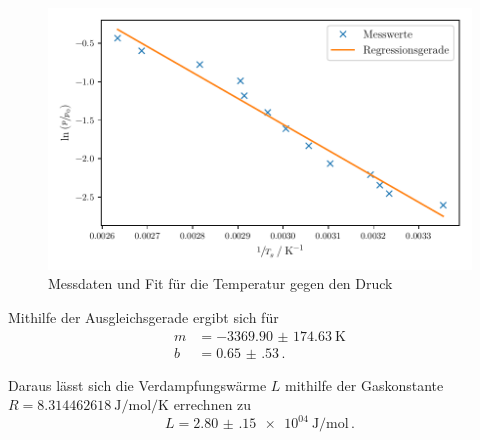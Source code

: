 \begin{figure}
    \centering
    \caption{Messdaten und Fit für die Temperatur gegen den Druck}
    \label{fig:hochdruck}
    \includegraphics{Daten/tiefdruck.pdf}
\end{figure}

\noindent
Mithilfe der Ausgleichsgerade ergibt sich für 
\begin{align*}
    m &= \SI{-3369.90(17463)}{\kelvin}\\
    b &= \SI{0.65(53)} \, .
\end{align*}

\noindent 
Daraus lässt sich die Verdampfungswärme $L$ mithilfe der Gaskonstante $R = \SI{8,314462618}{\joule\per\mole\per\kelvin}$\cite{gasconstant} errechnen zu 
\begin{equation*}
    L = \SI{2.80(15)e04}{\joule\per\mole} \, .
\end{equation*}

